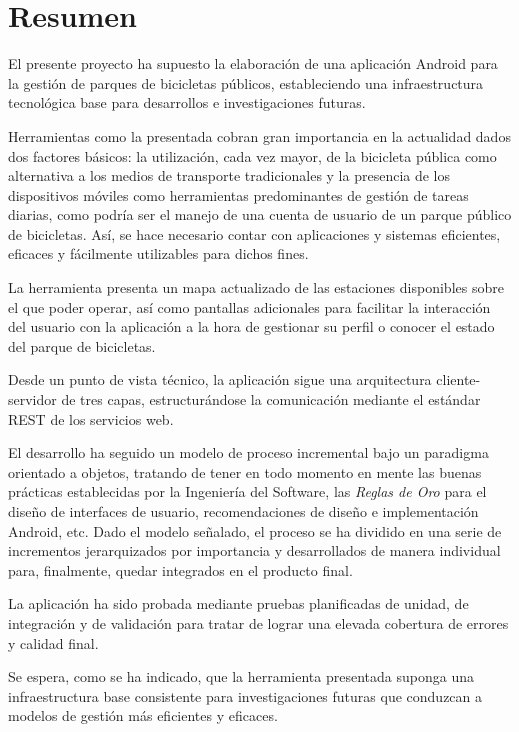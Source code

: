 
\chapter{Resumen}


El presente proyecto ha supuesto la elaboración de una aplicación Android para la gestión de parques de bicicletas públicos, estableciendo una infraestructura tecnológica base para desarrollos e investigaciones futuras. 

Herramientas como la presentada cobran gran importancia en la actualidad dados dos factores básicos: la utilización, cada vez mayor, de la bicicleta pública como alternativa a los medios de transporte tradicionales y la presencia de los dispositivos móviles como herramientas predominantes de gestión de tareas diarias, como podría ser el manejo de una cuenta de usuario de un parque público de bicicletas. Así, se hace necesario contar con aplicaciones y sistemas eficientes, eficaces y fácilmente utilizables para dichos fines.

La herramienta presenta un mapa actualizado de las estaciones disponibles sobre el que poder operar, así como pantallas adicionales para facilitar la interacción del usuario con la aplicación a la hora de gestionar su perfil o conocer el estado del parque de bicicletas.

Desde un punto de vista técnico, la aplicación sigue una arquitectura cliente-servidor de tres capas, estructurándose la comunicación mediante el estándar REST de los servicios web. 

El desarrollo ha seguido un modelo de proceso incremental bajo un paradigma orientado a objetos, tratando de tener en todo momento en mente las buenas prácticas establecidas por la Ingeniería del Software, las \emph{Reglas de Oro} para el diseño de interfaces de usuario, recomendaciones de diseño e implementación Android, etc. Dado el modelo señalado, el proceso se ha dividido en una serie de incrementos jerarquizados por importancia y desarrollados de manera individual para, finalmente, quedar integrados en el producto final.

La aplicación ha sido probada mediante pruebas planificadas de unidad, de integración y de validación para tratar de lograr una elevada cobertura de errores y calidad final.

Se espera, como se ha indicado, que la herramienta presentada suponga una infraestructura base consistente para investigaciones futuras que conduzcan a modelos de gestión más eficientes y eficaces.




